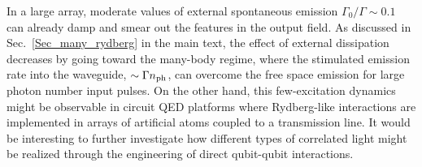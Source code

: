 \documentclass[pra,twocolumn,showpacs,preprintnumbers,amsmath,amssymb]{revtex4-1}
\begin{document}
In a large array, moderate values of external spontaneous emission $\Gamma_0/ \Gamma\sim 0.1$ can already damp and smear out the features in the output field. As discussed in Sec.~\ref{Sec_many_rydberg} in the main text, the effect of external dissipation decreases by going toward the many-body regime, where the stimulated emission rate into the waveguide, $\sim \Gamma n_{\rm ph}$, can overcome the free space emission for large photon number input pulses. On the other hand, this  few-excitation dynamics might be observable in circuit QED platforms where Rydberg-like interactions are implemented in arrays of artificial atoms coupled to a transmission line. It would be interesting to further investigate how different types of correlated light might be realized through the engineering of direct qubit-qubit interactions.
 
\end{document}
